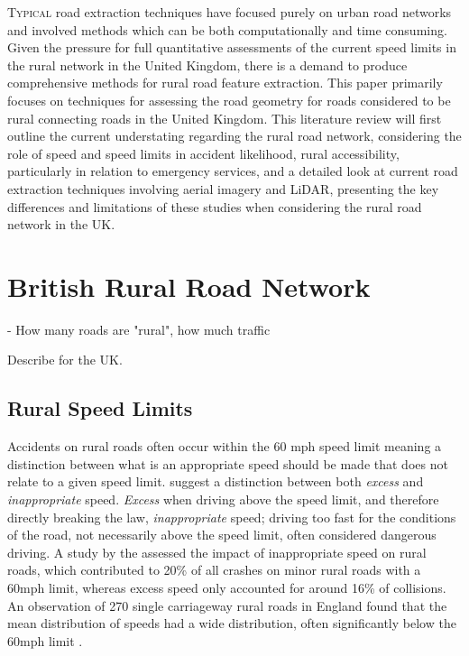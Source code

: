 \begin{multicols}{2}

    \lettrine{T}{ypical} road extraction techniques have focused purely on urban road networks and involved methods which can be both computationally and time consuming. Given the pressure for full quantitative assessments of the current speed limits in the rural network in the United Kingdom, there is a demand to produce comprehensive methods for rural road feature extraction. This paper primarily focuses on techniques for assessing the road geometry for roads considered to be rural connecting roads in the United Kingdom. This literature review will first outline the current understating regarding the rural road network, considering the role of speed and speed limits in accident likelihood, rural accessibility, particularly in relation to emergency services, and a detailed look at current road extraction techniques involving aerial imagery and LiDAR, presenting the key differences and limitations of these studies when considering the rural road network in the UK.

\section{British Rural Road Network}

- How many roads are "rural", how much traffic

Describe for the UK.

\subsection{Rural Speed Limits}

Accidents on rural roads often occur within the 60 mph speed limit meaning a distinction between what is an appropriate speed should be made that does not relate to a given speed limit. \cite{baruya1998} suggest a distinction between both \textit{excess} and \textit{inappropriate} speed. \textit{Excess} when driving above the speed limit, and therefore directly breaking the law, \textit{inappropriate} speed; driving too fast for the conditions of the road, not necessarily above the speed limit, often considered dangerous driving. A study by the \cite{departmentfortransport2013b} assessed the impact of inappropriate speed on rural roads, which contributed to 20\% of all crashes on minor rural roads with a 60mph limit, whereas excess speed only accounted for around 16\% of collisions. An observation of 270 single carriageway rural roads in England found that the mean distribution of speeds had a wide distribution, often significantly below the 60mph limit \citep{departmentfortransport2006}.


\end{multicols}
